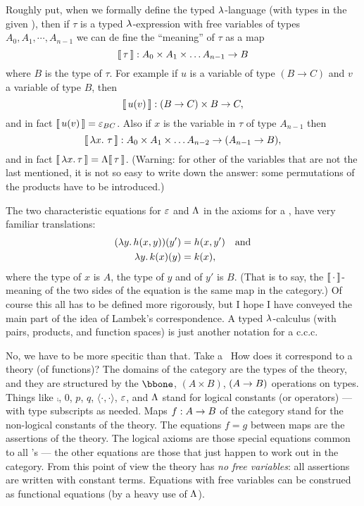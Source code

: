 Roughly put, when we formally define the typed $\lambda$-language (with types in the given
\ccc), then if $\tau$ is a typed $\lambda$-expression with free variables of types $A_0,
A_1,\cdots, A_{n-1}$ we can de fine the ``meaning'' of $\tau$ as a map
%
$$
\llbracket\, \tau \,\rrbracket: A_0 \times A_1 \times \dots A_{n-1} \rightarrow B
$$
%
where $B$ is the type of $\tau$. For example if $u$ is a variable of type $(B \to C)$ and
$v$ a variable of type $B$, then
$$
\llbracket\, u(v) \,\rrbracket: (B \rightarrow C) \times B \rightarrow C,
$$
%
and in fact $\llbracket\, u(v) \,\rrbracket = \varepsilon_{BC}$. Also if $x$ is the variable in $\tau$ of type $A_{n-1}$
then
$$
\means{\lm{x}.\, \tau}: A_0 \times A_1 \times \dots A_{n-2} \to (A_{n-1} \to B),
$$
%
and in fact $\llbracket\, \lambda x.\, \tau \,\rrbracket = \Lambda\llbracket\, \tau \,\rrbracket$. (Warning: for other of the variables
that are not the last mentioned, it is not so easy to write down the answer: some
permutations of the products have to be introduced.)

The two characteristic equations for $\varepsilon$ and $\Lambda$ in the axioms for a \ccc, have very
familiar translations:
\begin{align*}
( \lm{y}. h(x,y))(y') &= h(x,y') \quad {\textrm {and}} \\
\lm{y}. k(x)(y) &= k(x),
\end{align*}
%
where the type of $x$ is $A$, the type of $y$ and of $y'$ is $B$. (That is to say, the
$\llbracket\, \cdot \,\rrbracket$-meaning of the two sides of the equation is the same map in the category.)
Of course this all has to be defined more rigorously, but I hope I have conveyed the main
part of the idea of Lambek's correspondence. A typed $\lambda$-calculus (with pairs, products,
and function spaces) is just another notation for a {c.c.c}.

No, we have to be more specitic than that. Take a \ccc\ How does it correspond to a theory
(of functions)? The domains of the category are the types of the theory, and they are
structured by the $\bbone$, $(A \times B)$, $(A \rightarrow B)$ operations on types. Things like
$\comp$, $0$, $p$, $q$, $\langle\cdot,\cdot\rangle$, $\varepsilon$, and $\Lambda$ stand for logical
constants (or operators) --- with type subscripts as needed. Maps $f : A \rightarrow B$ of the
category stand for the non-logical constants of the theory. The equations $f = g$ between
maps are the assertions of the theory. The logical axioms are those special equations
common to all \ccc's --- the other equations are those that just happen to work out in the
category. From this point of view the theory has {\it no free variables}: all assertions
are written with constant terms. Equations with free variables can be construed as
functional equations (by a heavy use of $\Lambda$).


